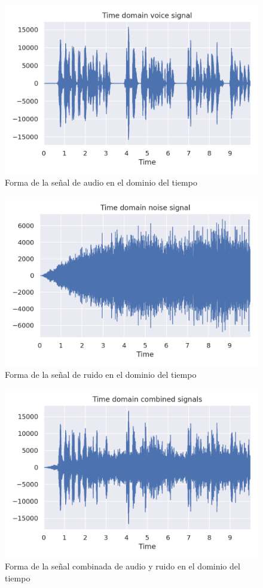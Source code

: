\begin{figure}[h!]
	\centering
	\includegraphics[width=0.9\columnwidth]{figures/audio_book_time.png}
	\caption{Forma de la señal de audio en el dominio del tiempo}
	\label{fig: voice_time}
\end{figure}

\begin{figure}[h!]
	\centering
	\includegraphics[width=0.9\columnwidth]{figures/noise_time.png}
	\caption{Forma de la señal de ruido en el dominio del tiempo}
	\label{fig: noise_time}
\end{figure}

\begin{figure}[h!]
	\centering
	\includegraphics[width=0.9\columnwidth]{figures/combination_time.png}
	\caption{Forma de la señal combinada de audio y ruido en el dominio del tiempo}
	\label{fig: combination_time}
\end{figure}

